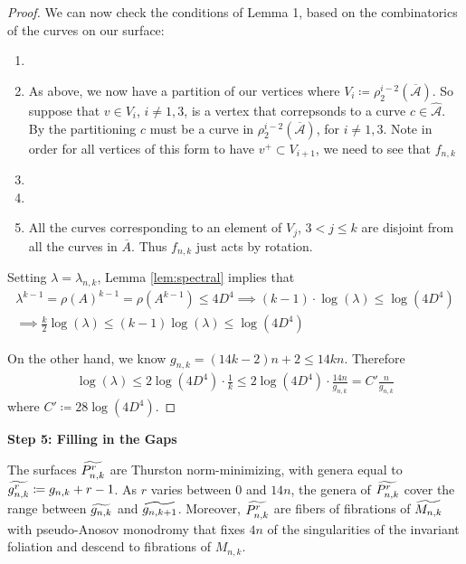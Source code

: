\begin{proof}
We can now check the conditions of Lemma 1, based on the combinatorics of the curves on our surface:
\begin{enumerate}
    \item
    \item As above, we now have a partition of our vertices where $V_i \coloneqq \rho_2^{i-2}(\overline{\mathcal{A}})$. So suppose that $v \in V_i$, $i \neq 1,3$, is a vertex that correpsonds to a curve $c \in \hat{\mathcal{A}}$. By the partitioning $c$ must be a curve in $\rho_2^{i-2}(\overline{\mathcal{A}})$, for $i \neq 1,3$. Note in order for all vertices of this form to have $v^+ \subset V_{i+1}$, we need to see that $f_{n,k}$
    \item
    \item
    \item All the curves corresponding to an element of $V_j$, $3 < j \leq k$ are disjoint from all the curves in $\overline{A}$. Thus $f_{n,k}$ just acts by rotation.
\end{enumerate}

Setting $\lambda = \lambda_{n,k}$, Lemma \ref{lem:spectral} implies that
\begin{gather*}
    \lambda^{k-1} = \rho(A)^{k-1} = \rho(A^{k-1}) \leq 4D^4 \implies (k-1)\cdot \log(\lambda) \leq \log(4D^4) \\
    \implies \frac{k}{2}\log(\lambda) \leq (k-1)\log(\lambda) \leq \log(4D^4)
\end{gather*}

On the other hand, we know $g_{n,k} = (14k - 2)n + 2 \leq 14kn$. Therefore
\begin{align*}
    \log(\lambda) \leq 2\log(4D^4)\cdot\frac{1}{k} \leq 2\log(4D^4)\cdot \frac{14n}{g_{n,k}} = C'\frac{n}{g_{n,k}}
\end{align*}
where $C' \coloneqq 28\log(4D^4)$.
\end{proof}

\begin{center}
\textbf{Step 5: Filling in the Gaps}
\end{center}


\begin{lem}
The surfaces $\widetilde{P^r_{n,k}}$ are Thurston norm-minimizing, with genera equal to $\widetilde{g^r_{n,k}} \coloneqq g_{n,k} + r - 1$. As $r$ varies between $0$ and $14n$, the genera of $\widetilde{P^r_{n,k}}$ cover the range between $\widetilde{g_{n,k}}$ and $\widetilde{g_{n,k+1}}$. Moreover, $\widetilde{P^r_{n,k}}$ are fibers of fibrations of $\widetilde{M_{n,k}}$ with pseudo-Anosov monodromy that fixes $4n$ of the singularities of the invariant foliation and descend to fibrations of $M_{n,k}$.
\end{lem}

